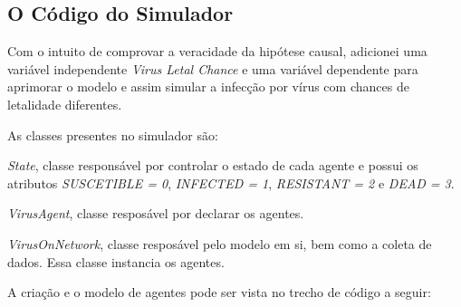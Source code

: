 \subsection{O Código do Simulador}

Com o intuito de comprovar a veracidade da hipótese causal, adicionei uma variável independente \textit{Virus Letal Chance} e uma variável dependente  para aprimorar o modelo e assim simular a infecção por vírus com chances de letalidade diferentes. 

As classes presentes no simulador são:
\begin{description}
    \item \textit{State}, classe responsável por controlar o estado de cada agente e possui os atributos \textit{SUSCETIBLE = 0}, \textit{INFECTED = 1}, \textit{RESISTANT = 2} e \textit{DEAD = 3}.
    \item \textit{VirusAgent}, classe resposável por declarar os agentes.
    \item \textit{VirusOnNetwork}, classe resposável pelo modelo em si, bem como a coleta de dados. Essa classe instancia os agentes. 
\end{description}

A criação e o modelo de agentes pode ser vista no trecho de código a seguir:

